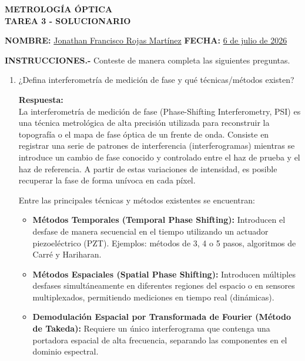 \documentclass[12pt,letterpaper]{article}
\begin{document}
	
	\begin{center}
		\Large \textbf{METROLOGÍA ÓPTICA} \\
		\vspace{0.3cm}
		\large \textbf{TAREA 3 - SOLUCIONARIO}
	\end{center}
	
	\vspace{0.5cm}
	\noindent \textbf{NOMBRE:} \underline{Jonathan Francisco Rojas Martínez} \hfill \textbf{FECHA:} \underline{6 de julio de 2026}
	
	\vspace{0.5cm}
	\noindent \textbf{INSTRUCCIONES.-} Conteste de manera completa las siguientes preguntas.
	\vspace{0.5cm}
	
	\begin{enumerate}
		\item[1.-] ¿Defina interferometría de medición de fase y qué técnicas/métodos existen?
		
		\vspace{0.3cm}
		\textbf{Respuesta:} \\
		La interferometría de medición de fase (Phase-Shifting Interferometry, PSI) es una técnica metrológica de alta precisión utilizada para reconstruir la topografía o el mapa de fase óptica de un frente de onda. Consiste en registrar una serie de patrones de interferencia (interferogramas) mientras se introduce un cambio de fase conocido y controlado entre el haz de prueba y el haz de referencia. A partir de estas variaciones de intensidad, es posible recuperar la fase de forma unívoca en cada píxel.
		
		Entre las principales técnicas y métodos existentes se encuentran:
		\begin{itemize}
			\item \textbf{Métodos Temporales (Temporal Phase Shifting):} Introducen el desfase de manera secuencial en el tiempo utilizando un actuador piezoeléctrico (PZT). Ejemplos: métodos de 3, 4 o 5 pasos, algoritmos de Carré y Hariharan.
			\item \textbf{Métodos Espaciales (Spatial Phase Shifting):} Introducen múltiples desfases simultáneamente en diferentes regiones del espacio o en sensores multiplexados, permitiendo mediciones en tiempo real (dinámicas).
			\item \textbf{Demodulación Espacial por Transformada de Fourier (Método de Takeda):} Requiere un único interferograma que contenga una portadora espacial de alta frecuencia, separando las componentes en el dominio espectral.
		\end{itemize}
		\vspace{0.5cm}
		

\end{enumerate}
\end{document}

